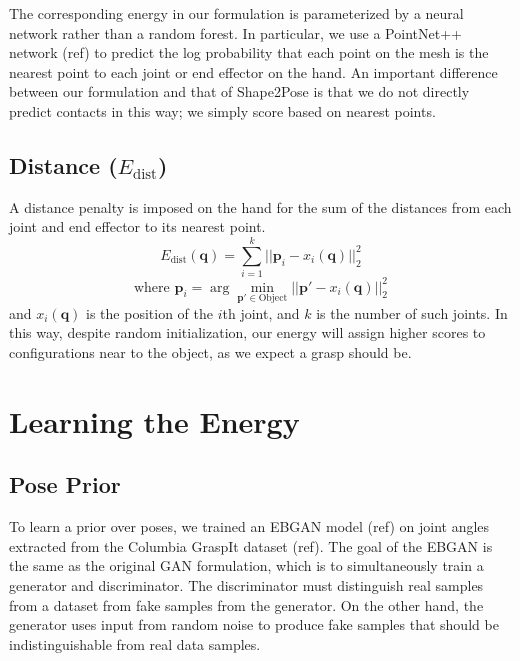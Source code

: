 \documentclass[10pt,twocolumn,letterpaper]{article}
\def\q{\mathbf{q}}
\def\p{\mathbf{p}}
\begin{document}
The corresponding energy in our formulation is parameterized by a neural network rather than a random forest. In particular, we use a PointNet++ network (ref) to predict the log probability that each point on the mesh is the nearest point to each joint or end effector on the hand. An important difference between our formulation and that of Shape2Pose is that we do not directly predict contacts in this way; we simply score based on nearest points.

\subsection{Distance ($E_{\text{dist}}$)}
A distance penalty is imposed on the hand for the sum of the distances from each joint and end effector to its nearest point.
\begin{equation}
E_{\text{dist}}(\q) = \sum_{i=1}^k ||\p_i - x_i(\q)||^2_2
\end{equation}
\begin{equation}
\text{where } \p_i = \arg \min_{\p' \in \text{Object}} ||\p' - x_i(\q)||^2_2
\end{equation}
and $x_i(\q)$ is the position of the $i$th joint, and $k$ is the number of such joints.
In this way, despite random initialization, our energy will assign higher scores to configurations near to the object, as we expect a grasp should be.


\section{Learning the Energy}
\subsection{Pose Prior}
To learn a prior over poses, we trained an EBGAN model (ref) on joint angles extracted from the Columbia GraspIt dataset (ref). The goal of the EBGAN is the same as the original GAN formulation, which is to simultaneously train a generator and discriminator. The discriminator must distinguish real samples from a dataset from fake samples from the generator. On the other hand, the generator uses input from random noise to produce fake samples that should be indistinguishable from real data samples. 
\end{document}
